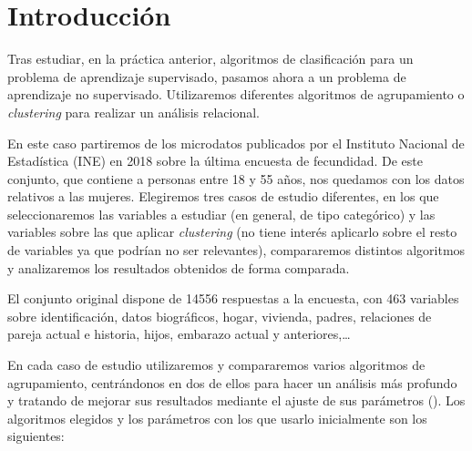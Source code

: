 \documentclass[a4paper, 20pt]{article}
\begin{document}
{\parskip=2pt
  \tableofcontents
}
\pagebreak

\section{Introducción}

Tras estudiar, en la práctica anterior, algoritmos de clasificación para un problema de aprendizaje supervisado, pasamos ahora a un problema de aprendizaje no supervisado. Utilizaremos diferentes algoritmos de agrupamiento o \textit{clustering} para realizar un análisis relacional.

En este caso partiremos de los microdatos publicados por el Instituto Nacional de Estadística (INE) en 2018 sobre la última encuesta de fecundidad. De este conjunto, que contiene a personas entre 18 y 55 años, nos quedamos con los datos relativos a las mujeres. Elegiremos tres casos de estudio diferentes, en los que seleccionaremos las variables a estudiar (en general, de tipo categórico) y las variables sobre las que aplicar \textit{clustering} (no tiene interés aplicarlo sobre el resto de variables ya que podrían no ser relevantes), compararemos distintos algoritmos y analizaremos los resultados obtenidos de forma comparada.

El conjunto original dispone de 14556 respuestas a la encuesta, con 463 variables sobre identificación, datos biográficos, hogar, vivienda, padres, relaciones de pareja actual e historia, hijos, embarazo actual y anteriores,\dots

En cada caso de estudio utilizaremos y compararemos varios algoritmos de agrupamiento, centrándonos en dos de ellos para hacer un análisis más profundo y tratando de mejorar sus resultados mediante el ajuste de sus parámetros (\cite{sklearn}). Los algoritmos elegidos y los parámetros con los que usarlo inicialmente son los siguientes:
\end{document}
